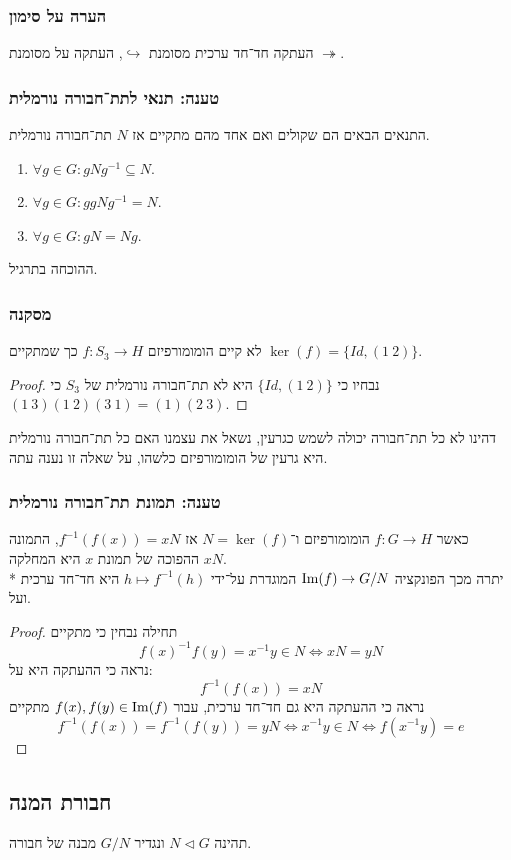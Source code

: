 \subsubsection{הערה על סימון}
העתקה חד־חד ערכית מסומנת $\hookrightarrow$,
העתקה על מסומנת $\twoheadrightarrow$.

\subsubsection{טענה: תנאי לתת־חבורה נורמלית}
התנאים הבאים הם שקולים ואם אחד מהם מתקיים אז $N$ תת־חבורה נורמלית.
\begin{enumerate}
	\item $\forall g \in G : g N g^{-1} \subseteq N$.
	\item $\forall g \in G : g g N g^{-1} = N$.
	\item $\forall g \in G : g N = N g$.
\end{enumerate}
ההוכחה בתרגיל.

\subsubsection{מסקנה}
לא קיים הומומורפיזם $f : S_3 \to H$ כך שמתקיים $\ker(f) = \{ Id, (1\ 2) \}$.
\begin{proof}
	נבחיו כי $\{ Id, (1\ 2)\}$ היא לא תת־חבורה נורמלית של $S_3$ כי $(1\ 3)(1\ 2)(3\ 1) = (1)(2\ 3)$.
\end{proof}
דהינו לא כל תת־חבורה יכולה לשמש כגרעין, נשאל את עצמנו האם כל תת־חבורה נורמלית היא גרעין של הומומורפיזם כלשהו, על שאלה זו נענה עתה.

\subsubsection{טענה: תמונת תת־חבורה נורמלית}
כאשר $f : G \to H$ הומומורפיזם ו־$N = \ker(f)$ אז $f^{-1}(f(x)) = x N$, התמונה ההפוכה של תמונת $x$ היא המחלקה $x N$. \\*
יתרה מכך הפונקציה $\operatorname{Im}(f) \to G/N$ המוגדרת על־ידי $h \mapsto f^{-1}(h)$ היא חד־חד ערכית ועל.
\begin{proof}
	תחילה נבחין כי מתקיים
	\[
		{f(x)}^{-1} f(y) = x^{-1} y \in N \iff xN = yN
	\]
	נראה כי ההעתקה היא על:
	\[
		f^{-1}(f(x)) = xN
	\]
	נראה כי ההעתקה היא גם חד־חד ערכית,
	עבור $f(x), f(y) \in \operatorname{Im}(f)$ מתקיים
	\[
		f^{-1}(f(x)) = f^{-1}(f(y)) = yN
		\iff
		x^{-1} y \in N
		\iff
		f(x^{-1} y) = e
	\]
\end{proof}

\subsection{חבורת המנה}
תהינה $N \triangleleft G$ ונגדיר $G/N$ מבנה של חבורה.

